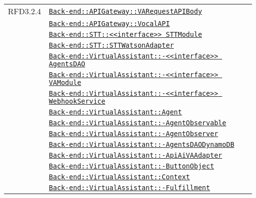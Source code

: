 \begin{longtable}{|>{\centering}m{3cm}|m{10cm}<{\centering}|}
RFD3.2.4 & \hyperref[Back-end::APIGateway::VARequestAPIBody]{\texttt{Back-end::APIGateway::VARequestAPIBody}}\\
& \hyperref[Back-end::APIGateway::VocalAPI]{\texttt{Back-end::APIGateway::VocalAPI}}\\
& \hyperref[Back-end::STT::<<interface>> STTModule]{\texttt{Back-end::STT::<<interface>> STTModule}}\\
& \hyperref[Back-end::STT::STTWatsonAdapter]{\texttt{Back-end::STT::STTWatsonAdapter}}\\
& \hyperref[Back-end::VirtualAssistant::<<interface>> AgentsDAO]{\texttt{Back-end::VirtualAssistant::-\linebreak <<interface>> AgentsDAO}}\\
& \hyperref[Back-end::VirtualAssistant::<<interface>> VAModule]{\texttt{Back-end::VirtualAssistant::-\linebreak <<interface>> VAModule}}\\
& \hyperref[Back-end::VirtualAssistant::<<interface>> WebhookService]{\texttt{Back-end::VirtualAssistant::-\linebreak <<interface>> WebhookService}}\\
& \hyperref[Back-end::VirtualAssistant::Agent]{\texttt{Back-end::VirtualAssistant::Agent}}\\
& \hyperref[Back-end::VirtualAssistant::AgentObservable]{\texttt{Back-end::VirtualAssistant::-\linebreak AgentObservable}}\\
& \hyperref[Back-end::VirtualAssistant::AgentObserver]{\texttt{Back-end::VirtualAssistant::-\linebreak AgentObserver}}\\
& \hyperref[Back-end::VirtualAssistant::AgentsDAODynamoDB]{\texttt{Back-end::VirtualAssistant::-\linebreak AgentsDAODynamoDB}}\\
& \hyperref[Back-end::VirtualAssistant::ApiAiVAAdapter]{\texttt{Back-end::VirtualAssistant::-\linebreak ApiAiVAAdapter}}\\
& \hyperref[Back-end::VirtualAssistant::ButtonObject]{\texttt{Back-end::VirtualAssistant::-\linebreak ButtonObject}}\\
& \hyperref[Back-end::VirtualAssistant::Context]{\texttt{Back-end::VirtualAssistant::Context}}\\
& \hyperref[Back-end::VirtualAssistant::Fulfillment]{\texttt{Back-end::VirtualAssistant::-\linebreak Fulfillment}}\\

\end{longtable}
